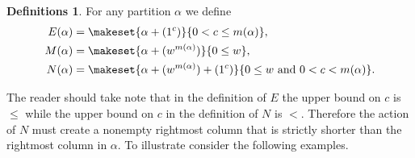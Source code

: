 \documentclass{article}
\theoremstyle{plain}
\theoremstyle{definition}
\newtheorem{definitions}[theorem]{Definitions}
\begin{document}
\begin{definitions}\label{def:EMN}
For any partition $\alpha$ we define
\begin{align*}
    E(\alpha) &= \makeset{\alpha +(1^c)}{0< c\leq m(\alpha)},\\
    M(\alpha) &= \makeset{\alpha + (w^{m(\alpha)} )}{0\leq w},\\
    N(\alpha) &= \makeset{\alpha + (w^{m(\alpha)} )+(1^c) }{0\leq w\text{ and } 0<c< m(\alpha)}.
\end{align*}
\end{definitions}
The reader should take note that in the definition of $E$ the upper bound on $c$ is $\leq$ while the upper bound on $c$ in the definition of $N$ is $<$.  Therefore the action of $N$ must create a nonempty rightmost column that is strictly shorter than the rightmost column in $\alpha$.  To illustrate consider the following examples.  
\end{document}
